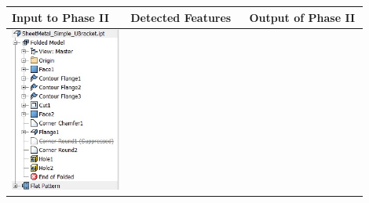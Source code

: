 \begin{minipage}[t]{\linewidth}
\begin{tabular}[h]{@{} p{0.3\linewidth} | p{0.3\linewidth} |  p{0.3\linewidth}@{}} \toprule

\textbf{Input to Phase II} & \textbf{Detected Features} & \textbf{Output of Phase II} \\ \midrule

\includegraphics[width=0.92\linewidth]{..//Common/images/DefeatPhase_II_t1} &

\end{tabular}
\end{minipage}
